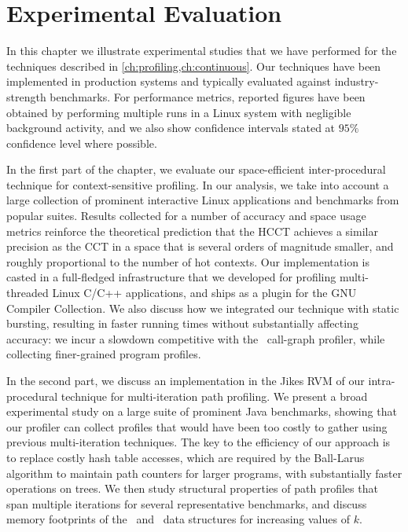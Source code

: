 \chapter{Experimental Evaluation}
\label{ch:experiments}

In this chapter we illustrate experimental studies that we have performed for the techniques described in \mychapter\ref{ch:profiling,ch:continuous}. Our techniques have been implemented in production systems and typically evaluated against industry-strength benchmarks. For performance metrics, reported figures have been obtained by performing multiple runs in a Linux system with negligible background activity, and we also show confidence intervals stated at $95\%$ confidence level where possible.

In the first part of the chapter, we evaluate our space-efficient inter-procedural technique for context-sensitive profiling. In our analysis, we take into account a large collection of prominent interactive Linux applications and benchmarks from popular suites. Results collected for a number of accuracy and space usage metrics reinforce the theoretical prediction that the HCCT achieves a similar precision as the CCT in a space that is several orders of magnitude smaller, and roughly proportional to the number of hot contexts. Our implementation is casted in a full-fledged infrastructure that we developed for profiling multi-threaded Linux C/C++ applications, and ships as a plugin for the GNU Compiler Collection. We also discuss how we integrated our technique with static bursting, resulting in faster running times without substantially affecting accuracy: we incur a slowdown competitive with the \gprof\ call-graph profiler, while collecting finer-grained program profiles. 

In the second part, we discuss an implementation in the Jikes RVM of our intra-procedural technique for multi-iteration path profiling. We present a broad experimental study on a large suite of prominent Java benchmarks, showing that our profiler can collect profiles that would have been too costly to gather using previous multi-iteration techniques. The key to the efficiency of our approach is to replace costly hash table accesses, which are  required by the Ball-Larus algorithm to maintain path counters for larger programs, with substantially faster operations on trees. We then study structural properties of path profiles that span multiple iterations for several representative benchmarks, and discuss memory footprints of the \ksf\ and \kipf\ data structures for increasing values of $k$.

